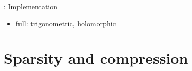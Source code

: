 \documentclass{beamer}
\newcommand{\real}{\mathbb{R}}
\newcommand{\cplx}{\mathbb{C}}
\newcommand{\conj}[1]{\overline{#1}}
\begin{document}
\begin{frame}[c]{\insertsection: Implementation}
\begin{itemize}
    \item full: trigonometric, holomorphic
  \end{itemize}




\end{frame}


\section{Sparsity and compression} %
\label{sec:compression}
\end{document}
